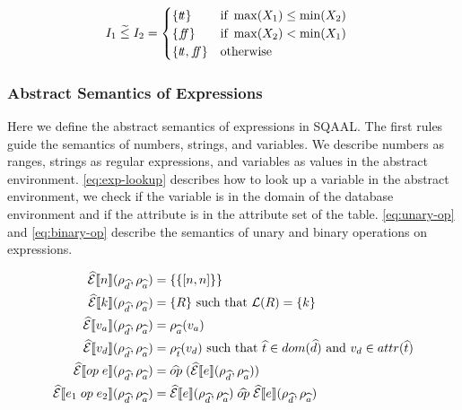 \begin{align}\label{eq:aaabcomp3}
    I_1 \;\aab{\leq}\; I_2 &= \begin{cases}
        \{\true\} & \text{if } \max(X_1) \leq \min(X_2) \\
        \{\false\} & \text{if } \max(X_2) < \min (X_1) \\
        \{\true, \false\} & \text{otherwise}
    \end{cases}
\end{align}

\subsubsection{Abstract Semantics of Expressions}

Here we define the abstract semantics of expressions in SQAAL.
The first rules guide the semantics of numbers, strings, and variables.
We describe numbers as ranges, strings as regular expressions, and variables as values in the abstract environment.
\autoref{eq:exp-lookup} describes how to look up a variable in the abstract environment, we check if the variable is in the domain of the database environment and if the attribute is in the attribute set of the table.
\autoref{eq:unary-op} and \autoref{eq:binary-op} describe the semantics of unary and binary operations on expressions.

\begin{align}
    \absexpsem{n}(\rho_{\ab{d}}, \rho_{\ab{a}}) &= \{ \{ [n, n] \} \}\\
    \absexpsem{k}(\rho_{\ab{d}}, \rho_{\ab{a}}) &= \{ R \} \text{ such that }\mathcal{L}(R) = \{ k \} \\
    \absexpsem{v_a}(\rho_{\ab{d}}, \rho_{\ab{a}}) &=  \rho_{\ab{a}}(v_a) \\
    \absexpsem{v_d}(\rho_{\ab{d}}, \rho_{\ab{a}}) &=  \rho_{\ab{t}}(v_d) \text{ such that } \ab{t} \in dom(\ab{d}) \text{ and } v_d \in attr(\ab{t}) \\ \label{eq:exp-lookup}
    \absexpsem{op \; e}(\rho_{\ab{d}}, \rho_{\ab{a}}) &= \ab{op} \; (\absexpsem{e}(\rho_{\ab{d}}, \rho_{\ab{a}})) \\ \label{eq:unary-op}
    \absexpsem{e_1 \; op \; e_2}(\rho_{\ab{d}}, \rho_{\ab{a}}) &= \absexpsem{e}(\rho_{\ab{d}}, \rho_{\ab{a}}) \;\ab{op}\; \absexpsem{e}(\rho_{\ab{d}}, \rho_{\ab{a}})\\ \label{eq:binary-op}
\end{align}

